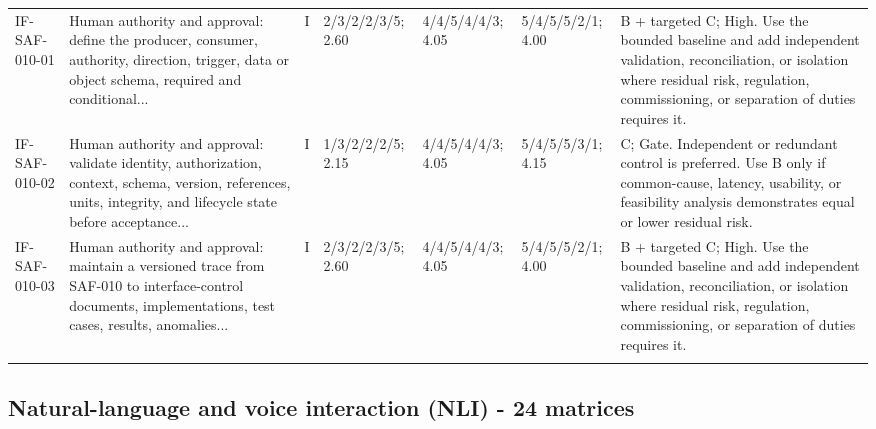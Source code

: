 \documentclass[11pt,letterpaper]{article}
\begin{document}
\begin{scriptsize}
\begin{longtable}{@{}L{0.11\textwidth}L{0.165\textwidth}L{0.04\textwidth}L{0.115\textwidth}L{0.115\textwidth}L{0.115\textwidth}L{0.235\textwidth}@{}}
\addlinespace[2pt]
IF-SAF-010-01 & Human authority and approval: define the producer, consumer, authority, direction, trigger, data or object schema, required and conditional... & I & 2/3/2/2/3/5; 2.60 & 4/4/5/4/4/3; 4.05 & 5/4/5/5/2/1; 4.00 & B + targeted C; High. Use the bounded baseline and add independent validation, reconciliation, or isolation where residual risk, regulation, commissioning, or separation of duties requires it. \\
\addlinespace[2pt]
IF-SAF-010-02 & Human authority and approval: validate identity, authorization, context, schema, version, references, units, integrity, and lifecycle state before acceptance... & I & 1/3/2/2/2/5; 2.15 & 4/4/5/4/4/3; 4.05 & 5/4/5/5/3/1; 4.15 & C; Gate. Independent or redundant control is preferred. Use B only if common-cause, latency, usability, or feasibility analysis demonstrates equal or lower residual risk. \\
\addlinespace[2pt]
IF-SAF-010-03 & Human authority and approval: maintain a versioned trace from SAF-010 to interface-control documents, implementations, test cases, results, anomalies... & I & 2/3/2/2/3/5; 2.60 & 4/4/5/4/4/3; 4.05 & 5/4/5/5/2/1; 4.00 & B + targeted C; High. Use the bounded baseline and add independent validation, reconciliation, or isolation where residual risk, regulation, commissioning, or separation of duties requires it. \\
\addlinespace[2pt]
\end{longtable}
\end{scriptsize}

\subsection{Natural-language and voice interaction (NLI) - 24 matrices}
\end{document}
